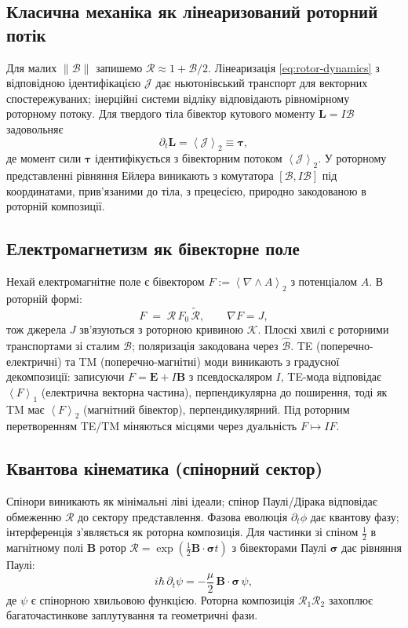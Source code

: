 \documentclass[11pt,a4paper]{article}
\newcommand{\grade}[2]{\left\langle #1 \right\rangle_{#2}}
\newcommand{\vecp}[1]{\grade{#1}{1}}
\newcommand{\biv}[1]{\grade{#1}{2}}
\newcommand{\rev}[1]{\widetilde{#1}}           %
\newcommand{\Rotor}{\mathcal{R}}
\newcommand{\Biv}{\mathcal{B}}
\newcommand{\D}{\nabla}                        %
\theoremstyle{definition}
\theoremstyle{plain}
\theoremstyle{remark}
\begin{document}
\subsection{Класична механіка як лінеаризований роторний потік}
Для малих $\|\Biv\|$ запишемо $\Rotor \approx 1+\Biv/2$. Лінеаризація \eqref{eq:rotor-dynamics} з відповідною ідентифікацією $\mathcal{J}$ дає ньютонівський транспорт для векторних спостережуваних; інерційні системи відліку відповідають рівномірному роторному потоку. Для твердого тіла бівектор кутового моменту $\bm{L}=I\Biv$ задовольняє
\begin{equation}
  \partial_t \bm{L} = \biv{\mathcal{J}} \equiv \bm{\tau},
\end{equation}
де момент сили $\bm{\tau}$ ідентифікується з бівекторним потоком $\biv{\mathcal{J}}$. У роторному представленні рівняння Ейлера виникають з комутатора $[\Biv, I\Biv]$ під координатами, прив'язаними до тіла, з прецесією, природно закодованою в роторній композиції.

\subsection{Електромагнетизм як бівекторне поле}
Нехай електромагнітне поле є бівектором $F:=\biv{\D\wedge A}$ з потенціалом $A$. В роторній формі:
\begin{equation}
  F \;=\; \Rotor\, F_0\, \rev{\Rotor},
  \qquad
  \D F = J,
\end{equation}
тож джерела $J$ зв'язуються з роторною кривиною $\mathcal{K}$. Плоскі хвилі є роторними транспортами зі сталим $\Biv$; поляризація закодована через $\hat{\Biv}$. TE (поперечно-електричні) та TM (поперечно-магнітні) моди виникають з градусної декомпозиції: записуючи $F = \bm{E} + I\bm{B}$ з псевдоскаляром $I$, TE-мода відповідає $\vecp{F}$ (електрична векторна частина), перпендикулярна до поширення, тоді як TM має $\biv{F}$ (магнітний бівектор), перпендикулярний. Під роторним перетворенням TE/TM міняються місцями через дуальність $F \mapsto IF$.

\subsection{Квантова кінематика (спінорний сектор)}
Спінори виникають як мінімальні ліві ідеали; спінор Паулі/Дірака відповідає обмеженню $\Rotor$ до сектору представлення. Фазова еволюція $\partial_t \phi$ дає квантову фазу; інтерференція з'являється як роторна композиція. Для частинки зі спіном $\tfrac{1}{2}$ в магнітному полі $\bm{B}$ ротор $\Rotor = \exp(\tfrac{1}{2}\bm{B}\cdot\bm{\sigma} t)$ з бівекторами Паулі $\bm{\sigma}$ дає рівняння Паулі:
\begin{equation}
  i\hbar\, \partial_t \psi = -\frac{\mu}{2}\, \bm{B}\cdot\bm{\sigma}\, \psi,
\end{equation}
де $\psi$ є спінорною хвильовою функцією. Роторна композиція $\Rotor_1 \Rotor_2$ захоплює багаточастинкове заплутування та геометричні фази.
\end{document}
